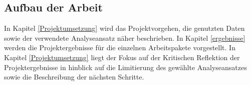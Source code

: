 \subsection{Aufbau der Arbeit}
In Kapitel \ref{Projektumsetzung} wird das Projektvorgehen, die genutzten Daten sowie der verwendete Analyseansatz näher beschrieben. In Kapitel \ref{ergebnisse} werden die Projektergebnisse für die einzelnen Arbeitspakete vorgestellt. In Kapitel \ref{Projektumsetzung} liegt der Fokus auf der Kritischen Reflektion der Projektergebnisse in hinblick auf die Limitierung des gewählte Analyseansatzes sowie die Beschreibung der nächsten Schritte. 